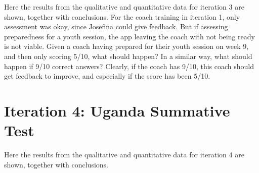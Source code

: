 Here the results from the qualitative and quantitative data for iteration 3 are shown, together with conclusions. For the coach training in iteration 1, only assessment was okay, since Josefina could give feedback. But if assessing preparedness for a youth session, the app leaving the coach with not being ready is not viable. Given a coach having prepared for their youth session on week 9, and then only scoring 5/10, what should happen? In a similar way, what should happen if 9/10 correct answers? Clearly, if the coach has 9/10, this coach should get feedback to improve, and especially if the score has been 5/10.






\section{Iteration 4: Uganda Summative Test}

Here the results from the qualitative and quantitative data for iteration 4 are shown, together with conclusions.



%


%
%
%  
%  
%  
%  
%
%
%
%  
%  
%  
%  
%
%
%  
%  
%  
%  


%


